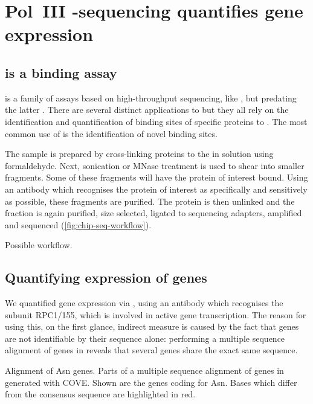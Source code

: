 \chapter{Pol~III -sequencing quantifies  gene
expression}
\label{sec:chip}

\section{ is a  binding assay}

\chipseq is a family of assays based on high-throughput sequencing, like
\rnaseq, but predating the latter \citet{Johnson:2007}. There are several
distinct applications to \chipseq but they all rely on the identification and
quantification of binding sites of specific proteins to \dna. The most common
use of \chipseq is the identification of novel \tf binding
sites.

The sample is prepared by cross-linking proteins to the \dna in solution using
formaldehyde. Next, sonication or MNase treatment is used to shear \dna into
smaller fragments. Some of these fragments will have the protein of interest
bound. Using an antibody which recognises the protein of interest as
specifically and sensitively as possible, these fragments are purified. The
protein is then unlinked and the \dna fraction is again purified, size selected,
ligated to sequencing adapters, amplified and sequenced
(\cref{fig:chip-seq-workflow}).

    {Possible \chipseq workflow.}
    {}

\section{Quantifying expression of  genes}

We quantified \trna gene expression via  \chipseq, using an antibody which
recognises the  subunit RPC1/155, which is involved in active \trna gene
transcription. The reason for using this, on the first glance, indirect measure
is caused by the fact that \trna genes are not identifiable by their sequence
alone: performing a multiple sequence alignment of \trna genes in \mmu reveals
that several \trna genes share the exact same sequence.

    {\footnotesize
    }
    {Alignment of Asn \trna genes.}
    {Parts of a multiple sequence alignment of \trna genes in \mmu generated
    with COVE\@. Shown are the \trna genes coding for Asn. Bases which differ
    from the consensus sequence are highlighted in red.}


